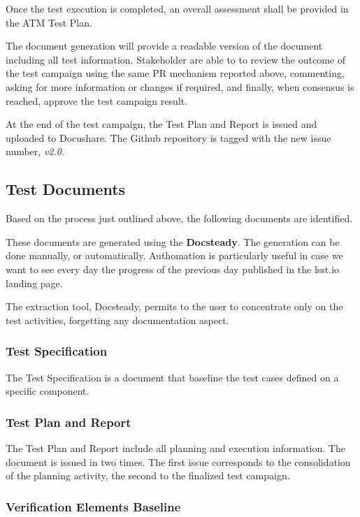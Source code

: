 Once the test execution is completed, an overall assessment shall be provided in the ATM Test Plan.

The document generation will provide a readable version of the document including all test information.
Stakeholder are able to to review the outcome of the test campaign using the same PR mechanism reported above, 
commenting, asking for more information or changes if required, and finally, when consensus is reached, approve the test campaign result.

At the end of the test campaign, the Test Plan and Report is issued and uploaded to Docushare.
The Github repository is tagged with the new issue number, \textit{v2.0}.


\subsection{Test Documents}

Based on the process just outlined above, the following documents are identified.

These documents are generated using the \textbf{Docsteady}.
The generation can be done manually, or automatically.
Authomation is particularly useful in case we want to see every day the progress of the previous day published in the lsst.io landing page.

The extraction tool, Docsteady, permits to the user to concentrate only on the test activities,
forgetting any documentation aspect.


\subsubsection{Test Specification}

The Test Specification is a document that baseline the test cases defined on a specific component.


\subsubsection{Test Plan and Report}

The Test Plan and Report include all planning and execution information. 
The document  is issued in two times. The first issue corresponds to the consolidation of the planning activity, 
the second to the finalized test campaign.


\subsubsection{Verification Elements Baseline}

